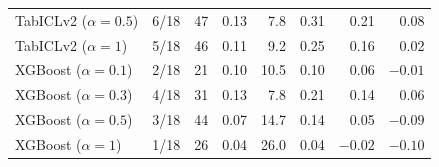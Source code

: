 \begin{table}[pos=!htbp,align=\centering]
{\begin{tabular}{lrrrrrrr}
TabICLv2 ($\alpha=0.5$) & 6/18 & 47 & 0.13 & 7.8 & 0.31 & 0.21 & 0.08 \\
TabICLv2 ($\alpha=1$) & 5/18 & 46 & 0.11 & 9.2 & 0.25 & 0.16 & 0.02 \\
XGBoost ($\alpha=0.1$) & 2/18 & 21 & 0.10 & 10.5 & 0.10 & 0.06 & $-0.01$ \\
XGBoost ($\alpha=0.3$) & 4/18 & 31 & 0.13 & 7.8 & 0.21 & 0.14 & 0.06 \\
XGBoost ($\alpha=0.5$) & 3/18 & 44 & 0.07 & 14.7 & 0.14 & 0.05 & $-0.09$ \\
XGBoost ($\alpha=1$) & 1/18 & 26 & 0.04 & 26.0 & 0.04 & $-0.02$ & $-0.10$ \\
\bottomrule
\end{tabular}}
\end{table}
